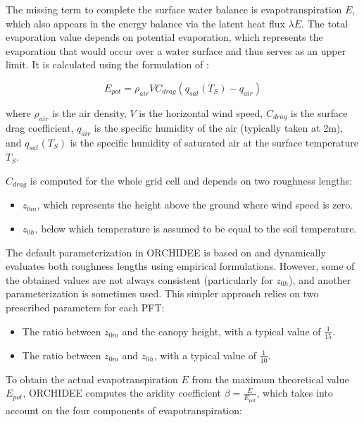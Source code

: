 The missing term to complete the surface water balance is evapotranspiration $E$, which also appears in the energy balance via the latent heat flux $\lambda E$. The total evaporation value depends on potential evaporation, which represents the evaporation that would occur over a water surface and thus serves as an upper limit. It is calculated using the formulation of \citet{Budyko_1956}:  

\begin{equation}
    E_{pot} = \rho_{air}  V C_{drag} (q_{sat}(T_S) - q_{air})
\end{equation}

where $\rho_{air}$ is the air density, $V$ is the horizontal wind speed, $C_{drag}$ is the surface drag coefficient, $q_{air}$ is the specific humidity of the air (typically taken at 2m), and $q_{sat}(T_S)$ is the specific humidity of saturated air at the surface temperature $T_S$.

$C_{drag}$ is computed for the whole grid cell and depends on two roughness lengths:  

\begin{itemize}
    \item $z_{0m}$, which represents the height above the ground where wind speed is zero.
    \item $z_{0h}$, below which temperature is assumed to be equal to the soil temperature. 
\end{itemize} 

The default parameterization in ORCHIDEE is based on \citet{su_evaluation_2001} and dynamically evaluates both roughness lengths using empirical formulations. However, some of the obtained values are not always consistent (particularly for $z_{0h}$), and another parameterization is sometimes used. 
This simpler approach relies on two prescribed parameters for each PFT:  
\begin{itemize}
    \item The ratio between $z_{0m}$ and the canopy height, with a typical value of $\frac{1}{15}$.
    \item The ratio between $z_{0m}$ and $z_{0h}$, with a typical value of $\frac{1}{10}$.  
\end{itemize}

To obtain the actual evapotranspiration $E$ from the maximum theoretical value $E_{pot}$, ORCHIDEE computes the aridity coefficient $\beta = \frac{E}{E_{pot}}$, which takes into account on the four components of evapotranspiration:  

